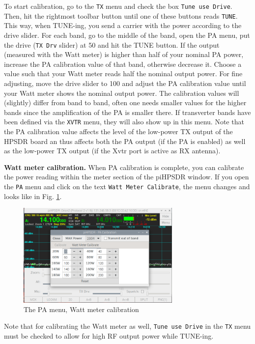 \documentclass[12pt]{book}
\def\rett#1{\texttt{\color{red}#1}}
\def\bltt#1{\texttt{\color{blue}#1}}
\def\pH{pi\-HPSDR\xspace}
\begin{document}
To start calibration, go to the \bltt{TX} menu and check the
box \rett{Tune use Drive}. Then, hit the rightmost toolbar button
until one of these buttons reads \bltt{TUNE}. This way, when
TUNE-ing, you send a carrier with the power according to the drive
slider. For each band, go to the middle of the band, open the PA
menu, put the drive (\rett{TX Drv} slider) at 50 and hit the TUNE button. If the
output (measured with the Watt meter) is higher than half
 of your nominal PA power, increase the
PA calibration value of that band, otherwise decrease it. Choose
a value such that your Watt meter reads half the nominal output
power. For fine adjusting, move the drive slider to 100 and
adjust the PA calibration value until your Watt meter shows the
nominal output  power. The calibration values will  (slightly)
differ from band to band, often one needs smaller values for the
higher bands since the amplification of the PA is smaller there.
If transverter bands have been defined via the \bltt{XVTR} menu,
they will also show up in this menu. Note that the PA calibration
value affects the level of the low-power TX output of the HPSDR board
an thus affects both the PA output (if the PA is enabled) as well
as the low-power TX output (if the Xvtr port is active as RX antenna).

\textbf{Watt meter calibration.} When PA calibration is complete,
you can calibrate the power reading within the meter section of
the \pH window. If you open the \bltt{PA} menu and click
on the text \rett{Watt Meter Calibrate}, the menu changes
and looks like in Fig. \ref{fig:PAMenuWatt}.

\begin{figure}[ht]
\center
\includegraphics[width=8cm]{PAmenuWatt.png}
\caption{The PA menu, Watt meter calibration}
\label{fig:PAMenuWatt}
\end{figure}
Note that for calibrating the Watt meter as well,
 \rett{Tune use Drive} in the \bltt{TX} menu must be checked
 to allow for high RF output
power while TUNE-ing.
\end{document}
